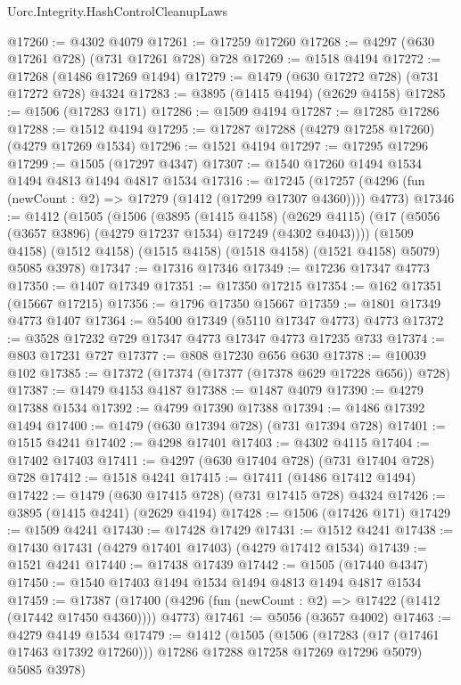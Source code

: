\begin{lexlean}{Uorc.Integrity.HashControlCleanupLaws}
\begin{coremodule}
@17260 := @4302 @4079
@17261 := @17259 @17260
@17268 := @4297 (@630 @17261 @728) (@731 @17261 @728) @728
@17269 := @1518 @4194
@17272 := @17268 (@1486 @17269 @1494)
@17279 := @1479 (@630 @17272 @728) (@731 @17272 @728) @4324
@17283 := @3895 (@1415 @4194) (@2629 @4158)
@17285 := @1506 (@17283 @171)
@17286 := @1509 @4194
@17287 := @17285 @17286
@17288 := @1512 @4194
@17295 := @17287 @17288 (@4279 @17258 @17260) (@4279 @17269 @1534)
@17296 := @1521 @4194
@17297 := @17295 @17296
@17299 := @1505 (@17297 @4347)
@17307 := @1540 @17260 @1494 @1534 @1494 @4813 @1494 @4817 @1534
@17316 := @17245
    (@17257 (@4296 (fun (newCount : @2) => @17279 (@1412 (@17299 @17307 @4360)))) @4773)
@17346 := @1412
    (@1505
      (@1506
        (@3895
          (@1415 @4158)
          (@2629 @4115)
          (@17 (@5056 (@3657 @3896) (@4279 @17237 @1534) @17249 (@4302 @4043))))
        (@1509 @4158)
        (@1512 @4158)
        (@1515 @4158)
        (@1518 @4158)
        (@1521 @4158)
        @5079)
      @5085
      @3978)
@17347 := @17316 @17346
@17349 := @17236 @17347 @4773
@17350 := @1407 @17349
@17351 := @17350 @17215
@17354 := @162 @17351 (@15667 @17215)
@17356 := @1796 @17350 @15667
@17359 := @1801 @17349 @4773 @1407
@17364 := @5400 @17349 (@5110 @17347 @4773) @4773
@17372 := @3528 @17232 @729 @17347 @4773 @17347 @4773 @17235 @733
@17374 := @803 @17231 @727
@17377 := @808 @17230 @656 @630
@17378 := @10039 @102
@17385 := @17372 (@17374 (@17377 (@17378 @629 @17228 @656)) @728)
@17387 := @1479 @4153 @4187
@17388 := @1487 @4079
@17390 := @4279 @17388 @1534
@17392 := @4799 @17390 @17388
@17394 := @1486 @17392 @1494
@17400 := @1479 (@630 @17394 @728) (@731 @17394 @728)
@17401 := @1515 @4241
@17402 := @4298 @17401
@17403 := @4302 @4115
@17404 := @17402 @17403
@17411 := @4297 (@630 @17404 @728) (@731 @17404 @728) @728
@17412 := @1518 @4241
@17415 := @17411 (@1486 @17412 @1494)
@17422 := @1479 (@630 @17415 @728) (@731 @17415 @728) @4324
@17426 := @3895 (@1415 @4241) (@2629 @4194)
@17428 := @1506 (@17426 @171)
@17429 := @1509 @4241
@17430 := @17428 @17429
@17431 := @1512 @4241
@17438 := @17430 @17431 (@4279 @17401 @17403) (@4279 @17412 @1534)
@17439 := @1521 @4241
@17440 := @17438 @17439
@17442 := @1505 (@17440 @4347)
@17450 := @1540 @17403 @1494 @1534 @1494 @4813 @1494 @4817 @1534
@17459 := @17387
    (@17400 (@4296 (fun (newCount : @2) => @17422 (@1412 (@17442 @17450 @4360)))) @4773)
@17461 := @5056 (@3657 @4002)
@17463 := @4279 @4149 @1534
@17479 := @1412
    (@1505
      (@1506 (@17283 (@17 (@17461 @17463 @17392 @17260))) @17286 @17288 @17258 @17269 @17296 @5079)
      @5085
      @3978)

\end{coremodule}
\end{lexlean}
